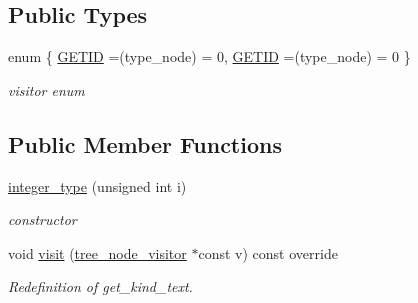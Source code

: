 \subsection*{Public Types}
\begin{DoxyCompactItemize}
\item 
enum \{ \hyperlink{structinteger__type_a9a3981dbefd2a0254c0423da687b2884a349f2bda283f262aec8d3164f17fa7a2}{G\+E\+T\+ID} =(type\+\_\+node) = 0, 
\hyperlink{structinteger__type_a9a3981dbefd2a0254c0423da687b2884a349f2bda283f262aec8d3164f17fa7a2}{G\+E\+T\+ID} =(type\+\_\+node) = 0
 \}\begin{DoxyCompactList}\small\item\em visitor enum \end{DoxyCompactList}
\end{DoxyCompactItemize}
\subsection*{Public Member Functions}
\begin{DoxyCompactItemize}
\item 
\hyperlink{structinteger__type_a20a89fdf17de1c45ef0d94af84091d28}{integer\+\_\+type} (unsigned int i)
\begin{DoxyCompactList}\small\item\em constructor \end{DoxyCompactList}\item 
void \hyperlink{structinteger__type_af6ef21cdf33588b79656e930c2444987}{visit} (\hyperlink{classtree__node__visitor}{tree\+\_\+node\+\_\+visitor} $\ast$const v) const override
\begin{DoxyCompactList}\small\item\em Redefinition of get\+\_\+kind\+\_\+text. \end{DoxyCompactList}\end{DoxyCompactItemize}
